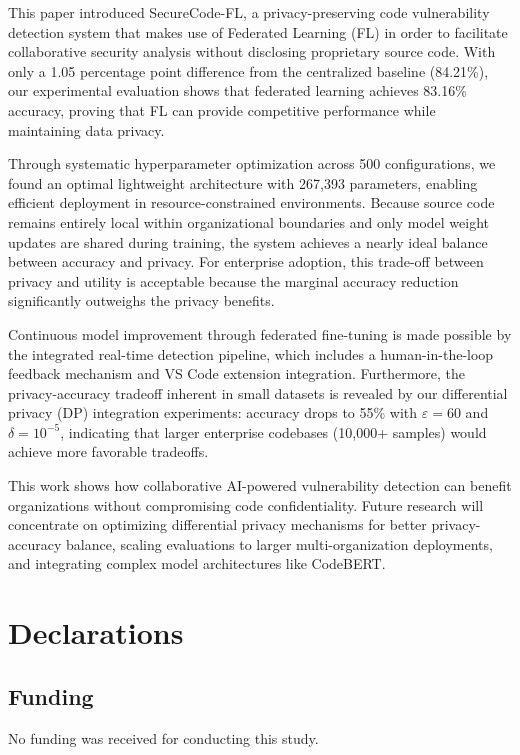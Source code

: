 \documentclass[pdflatex,sn-mathphys-num]{sn-jnl}
\theoremstyle{thmstyleone}%
\theoremstyle{thmstyletwo}%
\theoremstyle{thmstylethree}%
\begin{document}
This paper introduced SecureCode-FL, a privacy-preserving code vulnerability detection system that makes use of Federated Learning (FL) in order to facilitate collaborative security analysis without disclosing proprietary source code. With only a 1.05 percentage point difference from the centralized baseline (84.21\%), our experimental evaluation shows that federated learning achieves 83.16\% accuracy, proving that FL can provide competitive performance while maintaining data privacy.

Through systematic hyperparameter optimization across 500 configurations, we found an optimal lightweight architecture with 267,393 parameters, enabling efficient deployment in resource-constrained environments. Because source code remains entirely local within organizational boundaries and only model weight updates are shared during training, the system achieves a nearly ideal balance between accuracy and privacy. For enterprise adoption, this trade-off between privacy and utility is acceptable because the marginal accuracy reduction significantly outweighs the privacy benefits.

Continuous model improvement through federated fine-tuning is made possible by the integrated real-time detection pipeline, which includes a human-in-the-loop feedback mechanism and VS Code extension integration. Furthermore, the privacy-accuracy tradeoff inherent in small datasets is revealed by our differential privacy (DP) integration experiments: accuracy drops to 55\% with $\varepsilon=60$ and $\delta=10^{-5}$, indicating that larger enterprise codebases (10,000+ samples) would achieve more favorable tradeoffs.

This work shows how collaborative AI-powered vulnerability detection can benefit organizations without compromising code confidentiality. Future research will concentrate on optimizing differential privacy mechanisms for better privacy-accuracy balance, scaling evaluations to larger multi-organization deployments, and integrating complex model architectures like CodeBERT.

\backmatter
\section{Declarations}

\subsection{Funding}
No funding was received for conducting this study.
\end{document}
